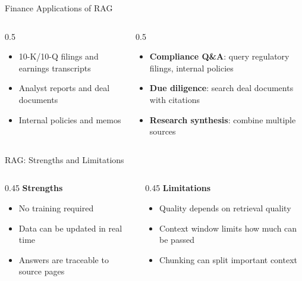 \documentclass[aspectratio=169]{beamer}
\begin{document}
\begin{frame}{Finance Applications of RAG}
\begin{columns}[T]
\begin{column}{0.5\textwidth}
\begin{shadedbox}[title=\textbf{Document Types}]
\begin{itemize}\small
  \item 10-K/10-Q filings and earnings transcripts
  \item Analyst reports and deal documents
  \item Internal policies and memos
\end{itemize}
\end{shadedbox}
\end{column}
\begin{column}{0.5\textwidth}
\begin{shadedbox}[title=\textbf{Use Cases}]
\begin{itemize}\small
  \item \textbf{Compliance Q\&A}: query regulatory filings, internal policies
  \item \textbf{Due diligence}: search deal documents with citations
  \item \textbf{Research synthesis}: combine multiple sources
\end{itemize}
\end{shadedbox}
\end{column}
\end{columns}
\end{frame}

\begin{frame}{RAG: Strengths and Limitations}
\begin{columns}[T]
\begin{column}{0.45\textwidth}
\textbf{Strengths}
\begin{itemize}\small
  \item No training required
  \item Data can be updated in real time
  \item Answers are traceable to source pages
\end{itemize}
\end{column}
\begin{column}{0.45\textwidth}
\textbf{Limitations}
\begin{itemize}\small
  \item Quality depends on retrieval quality
  \item Context window limits how much can be passed
  \item Chunking can split important context
\end{itemize}
\end{column}
\end{columns}
\end{frame}
\end{document}
